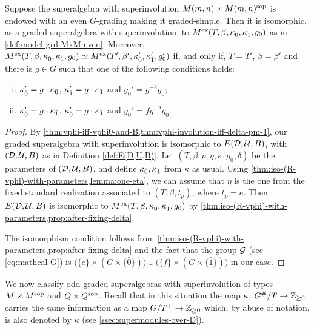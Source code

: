 \begin{thm}\label{thm:MxM-even}
    Suppose the superalgebra with superinvolution $M(m,n) \times M(m,n)^{\mathrm{sop}}$ is endowed with an even $G$-grading making it graded-simple. 
    Then it is isomorphic, as a graded superalgebra with superinvolution, to $M^{\mathrm{ex}}(T,\beta, \kappa_{\bar{0}}, \kappa_{\bar{1}}, g_0)$ as in \cref{def:model-grd-MxM-even}. 
    Moreover, $M^{\mathrm{ex}} (T, \beta, \kappa_{\bar{0}}, \kappa_{\bar{1}}, g_0) \simeq M^{\mathrm{ex}} (T', \beta', \kappa_{\bar{0}}', \kappa_{\bar{1}}', g_0')$ if, and only if, $T =T'$, $\beta = \beta'$ and there is $g \in G$ such that one of the following conditions holds:
    \begin{enumerate}[(i)]
        \item $\kappa_{\bar{0}}' = g\cdot\kappa_{\bar{0}}$, $\kappa_{\bar{1}}' = g\cdot\kappa_{\bar{1}}$ and $g_0' = g^{-2}g_0$;
        \item $\kappa_{\bar{0}}' = g\cdot\kappa_{\bar{1}}$, $\kappa_{\bar{0}}' = g\cdot\kappa_{\bar{1}}$ and $g_0' = fg^{-2}g_0$. 
    \end{enumerate}
\end{thm}

\begin{proof}
    By \cref{thm:vphi-iff-vphi0-and-B,thm:vphi-involution-iff-delta-pm-1}, our graded superalgebra with superinvolution is isomorphic to $E(\mathcal{D}, \mathcal U, B)$, with $(\mathcal{D}, \mathcal U, B)$ as in Definition \ref{def:E(D,U,B)}. 
    Let $(T, \beta, p, \eta, \kappa, g_0, \delta)$ be the parameters of $(\mathcal{D}, \mathcal U, B)$, and define $\kappa_{\bar{0}}, \kappa_{\bar{1}}$ from $\kappa$ as usual. 
    Using \cref{thm:iso-(R-vphi)-with-parameters,lemma:one-eta}, we can assume that $\eta$ is the one from the fixed standard realization associated to $(T, \beta, t_p)$, where $t_p = e$. 
    Then $E(\mathcal{D}, \mathcal U, B)$ is isomorphic to $M^{\mathrm{ex}} (T, \beta, \kappa_{\bar{0}}, \kappa_{\bar{1}}, g_0)$ by \cref{thm:iso-(R-vphi)-with-parameters,prop:after-fixing-delta}. 
    
    The isomorphism condition follows from \cref{thm:iso-(R-vphi)-with-parameters,prop:after-fixing-delta} and the fact that the group $\mathcal G$ (see \cref{eq:mathcal-G}) is $\big( \{e\} \times (G \times \{ \bar 0 \}) \big) \cup \big( \{f\} \times (G \times \{ \bar 1 \}) \big)$ in our case.
\end{proof}



We now classify odd graded superalgebras with superinvolution of types $M\times M^{\mathrm{sop}}$ and $Q \times Q^{\mathrm{sop}}$. 
Recall that in this situation the map $\kappa\colon G^\#/T \to \mathbb{Z}_{\geq 0}$ carries the same information as a map $G/T^+ \to \mathbb{Z}_{\geq 0}$ which, by abuse of notation, is also denoted by $\kappa$ (see \cref{ssec:supermodules-over-D}). 

